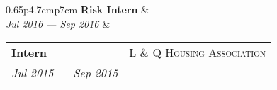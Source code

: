 \documentclass[10pt]{article}
\begin{document}
\begin{minipage}[t]{0.65\linewidth}
\begin{tabularx}{0.65\linewidth}{p{4.7cm}p{7cm}}
\textbf{Risk Intern} &                    \\
\textit{Jul 2016 --- Sep 2016} & \\ 
\end{tabularx}
\vspace{0.1cm}

\begin{tabularx}{0.65\linewidth}{p{4.7cm}p{7cm}}
\textbf{Intern} & \multicolumn{1}{r}{\textsc{L \& Q Housing Association}}                  \\
\textit{Jul 2015 --- Sep 2015} &
\end{tabularx}


\end{minipage}
\end{document}
